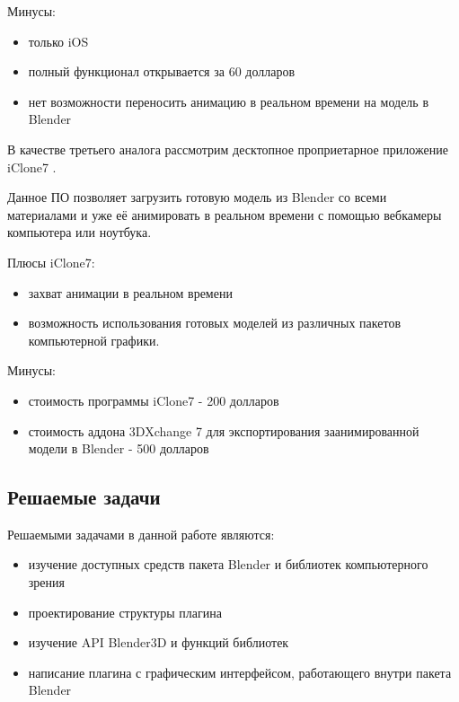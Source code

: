 Минусы:
\begin{itemize}
	\item только iOS
	\item полный функционал открывается за 60 долларов
	\item нет возможности переносить анимацию в реальном времени на модель в Blender
\end{itemize}

В качестве третьего аналога рассмотрим десктопное проприетарное приложение iClone7 \cite{iclone}.

Данное ПО позволяет загрузить готовую модель из Blender со всеми материалами и уже её анимировать в реальном времени с помощью вебкамеры компьютера или ноутбука.

Плюсы iClone7:
\begin{itemize}
	\item захват анимации в реальном времени
	\item возможность использования готовых моделей из различных пакетов компьютерной графики.
\end{itemize}
Минусы:
\begin{itemize}
	\item стоимость программы iClone7 - 200 долларов
	\item стоимость аддона 3DXchange 7 для экспортирования заанимированной модели в Blender - 500 долларов
\end{itemize}


\subsection{Решаемые задачи}


Решаемыми задачами в данной работе являются:
\begin{itemize}
	\item изучение доступных средств пакета Blender и библиотек компьютерного зрения
	\item проектирование структуры плагина
	\item изучение API Blender3D и функций библиотек 
	\item написание плагина с графическим интерфейсом, работающего внутри пакета Blender
\end{itemize}


\clearpage
